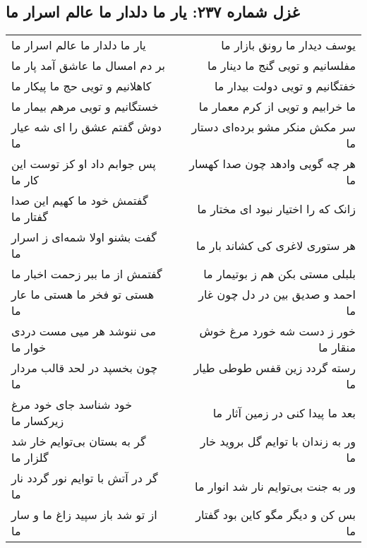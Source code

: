 \begin{center}
\section*{غزل شماره ۲۳۷: یار ما دلدار ما عالم اسرار ما}
\label{sec:0237}
\begin{longtable}{l p{0.5cm} r}
یار ما دلدار ما عالم اسرار ما
&&
یوسف دیدار ما رونق بازار ما
\\
بر دم امسال ما عاشق آمد پار ما
&&
مفلسانیم و تویی گنج ما دینار ما
\\
کاهلانیم و تویی حج ما پیکار ما
&&
خفتگانیم و تویی دولت بیدار ما
\\
خستگانیم و تویی مرهم بیمار ما
&&
ما خرابیم و تویی از کرم معمار ما
\\
دوش گفتم عشق را ای شه عیار ما
&&
سر مکش منکر مشو برده‌ای دستار ما
\\
پس جوابم داد او کز توست این کار ما
&&
هر چه گویی وادهد چون صدا کهسار ما
\\
گفتمش خود ما کهیم این صدا گفتار ما
&&
زانک که را اختیار نبود ای مختار ما
\\
گفت بشنو اولا شمه‌ای ز اسرار ما
&&
هر ستوری لاغری کی کشاند بار ما
\\
گفتمش از ما ببر زحمت اخبار ما
&&
بلبلی مستی بکن هم ز بوتیمار ما
\\
هستی تو فخر ما هستی ما عار ما
&&
احمد و صدیق بین در دل چون غار ما
\\
می ننوشد هر میی مست دردی خوار ما
&&
خور ز دست شه خورد مرغ خوش منقار ما
\\
چون بخسپد در لحد قالب مردار ما
&&
رسته گردد زین قفس طوطی طیار ما
\\
خود شناسد جای خود مرغ زیرکسار ما
&&
بعد ما پیدا کنی در زمین آثار ما
\\
گر به بستان بی‌توایم خار شد گلزار ما
&&
ور به زندان با توایم گل بروید خار ما
\\
گر در آتش با توایم نور گردد نار ما
&&
ور به جنت بی‌توایم نار شد انوار ما
\\
از تو شد باز سپید زاغ ما و سار ما
&&
بس کن و دیگر مگو کاین بود گفتار ما
\\
\end{longtable}
\end{center}
